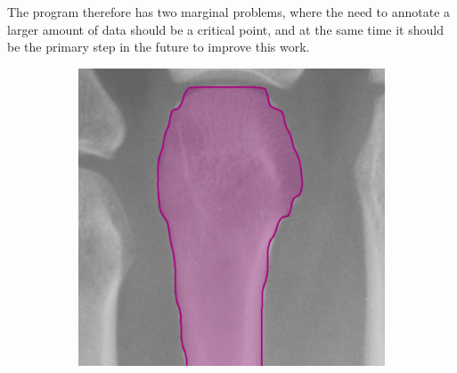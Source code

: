 The program therefore has two marginal problems, where the need to annotate a larger amount of data should be a critical point, and at the same time it should be the primary step in the future to improve this work.

\begin{figure}[!ht]
    \centering
    \begin{subfigure}[b]{.442\textwidth}
    \centering
       \includegraphics[width=\textwidth]{obrazky-figures/imperfection.pdf}
        \caption{}\label{contour-imperfection}
    \end{subfigure}
    \begin{subfigure}[b]{.3\textwidth}
    \centering

\end{subfigure}
\end{figure}
